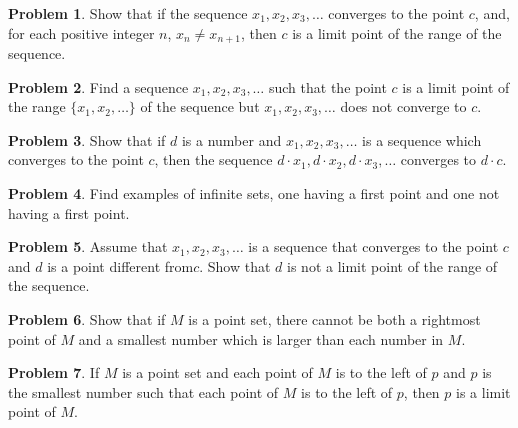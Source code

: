 \documentclass{article}
\theoremstyle{definition}
\newtheorem{problem}{Problem}
\begin{document}
\begin{problem}
Show that if the sequence $x_1, x_2, x_3, \dots$ converges to the point $c$, and, for each positive integer $n$, $x_n \neq x_{n+1}$, then $c$ is a limit point of the range of the sequence.
\end{problem}

\begin{problem}
Find a sequence $x_1, x_2, x_3, \dots$ such that the point $c$ is a limit point of the range $\{x_1, x_2, \dots \}$ of the sequence but $x_1, x_2, x_3, \dots$ does not converge to $c$. 
\end{problem}

\begin{problem}
Show that if $d$ is a number and $x_1, x_2, x_3, \dots$ is a sequence which converges to the point $c$, then the sequence $d \cdot x_1, d \cdot x_2, d \cdot x_3, \dots$ converges to $d \cdot c$.
\end{problem}

\begin{problem}
Find examples of infinite sets, one having a first point and one not having a first point.
\end{problem}

\begin{problem}
Assume that $x_1, x_2, x_3, \dots$ is a sequence that converges to the point $c$ and $d$ is a point different from$c$. Show that $d$ is not a limit point of the range of the sequence.
\end{problem}

\begin{problem}
Show that if $M$ is a point set, there cannot be both a rightmost point of $M$ and a smallest number which is larger than each number in $M$.
\end{problem}

\begin{problem}
If $M$ is a point set and each point of $M$ is to the left of $p$ and $p$ is the smallest number such that each point of $M$ is to the left of $p$, then $p$ is a limit point of $M$.
\end{problem}
\end{document}
